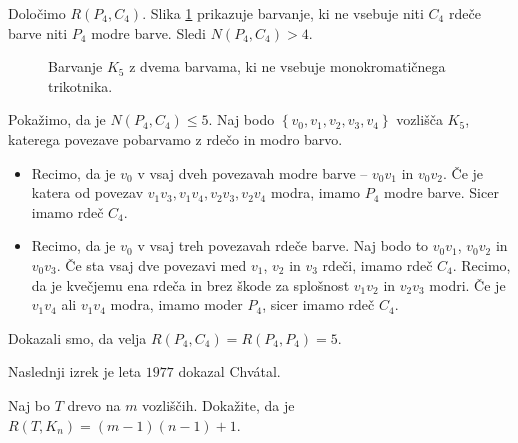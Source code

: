 \documentclass[twoside,11pt]{article}
\providecommand{\set}[1]{\left\{#1\right\}}
\begin{document}
\begin{zgled}
    Določimo $R(P_4, C_4)$.
    Slika \ref{fig:p4c4} prikazuje barvanje, ki ne vsebuje niti $C_4$ rdeče 
    barve niti $P_4$ modre barve. Sledi $N(P_4,C_4) > 4$.

    \begin{figure}[h!]
        \centering
        \newcommand\size{1}
        \caption{Barvanje $K_{5}$ z dvema barvama, ki ne vsebuje monokromatičnega trikotnika.}
        \label{fig:p4c4}
    \end{figure}

    Pokažimo, da je $N(P_4, C_4) \le 5$. Naj bodo $\set{v_0, v_1, v_2, v_3, v_4}$ vozlišča
    $K_5$, katerega povezave pobarvamo z rdečo in modro barvo.
    \begin{itemize}
        \item Recimo, da je $v_0$ v vsaj dveh povezavah modre barve -- $v_0v_1$ in $v_0v_2$. Če je
        katera od povezav $v_1v_3, v_1v_4, v_2v_3, v_2v_4$ modra, imamo $P_4$ modre barve.
        Sicer imamo rdeč $C_4$.

        \item Recimo, da je $v_0$ v vsaj treh povezavah rdeče barve. Naj bodo to $v_0v_1$, $v_0v_2$
        in $v_0v_3$. Če sta vsaj dve povezavi med $v_1$, $v_2$ in $v_3$ rdeči, imamo 
        rdeč $C_4$. Recimo, da je kvečjemu ena rdeča in brez škode za splošnost $v_1v_2$ in $v_2v_3$ 
        modri. Če je $v_1v_4$ ali $v_1v_4$ modra, imamo moder $P_4$, sicer imamo rdeč $C_4$.
    \end{itemize}

    Dokazali smo, da velja $R(P_4, C_4) = R(P_4, P_4) = 5$.
\end{zgled}

Naslednji izrek je leta $1977$ dokazal Chvátal.

\begin{izrek}[Chvátal]
    Naj bo $T$ drevo na $m$ vozliščih. Dokažite, da je $R(T, K_n) = (m-1)(n-1)+1$.    
\end{izrek}
\end{document}
